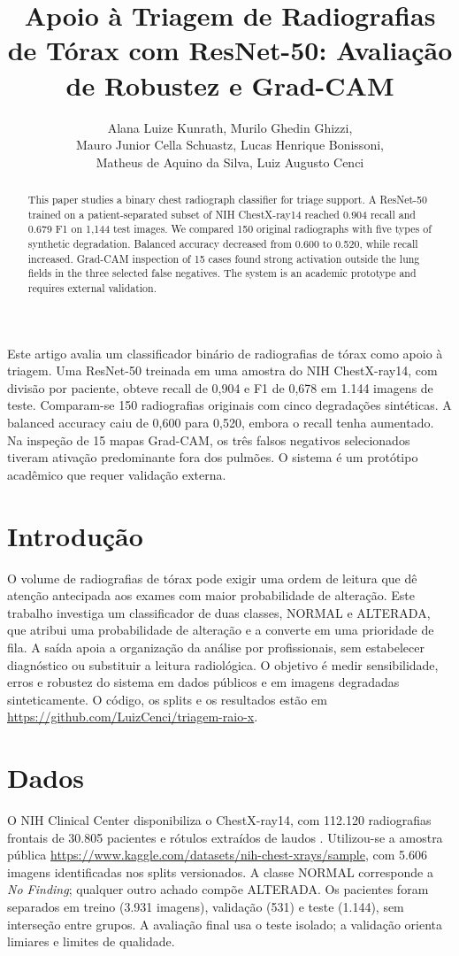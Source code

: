 \documentclass[12pt]{article}
\title{Apoio à Triagem de Radiografias de Tórax com ResNet-50: Avaliação de Robustez e Grad-CAM}
\author{Alana Luize Kunrath\inst{1}, Murilo Ghedin Ghizzi\inst{1},\\
Mauro Junior Cella Schuastz\inst{1}, Lucas Henrique Bonissoni\inst{1},\\
Matheus de Aquino da Silva\inst{1}, Luiz Augusto Cenci\inst{1}}
\begin{document}
\maketitle
\begin{abstract}
This paper studies a binary chest radiograph classifier for triage support. A ResNet-50 trained on a patient-separated subset of NIH ChestX-ray14 reached 0.904 recall and 0.679 F1 on 1,144 test images. We compared 150 original radiographs with five types of synthetic degradation. Balanced accuracy decreased from 0.600 to 0.520, while recall increased. Grad-CAM inspection of 15 cases found strong activation outside the lung fields in the three selected false negatives. The system is an academic prototype and requires external validation.
\end{abstract}
\begin{resumo}
Este artigo avalia um classificador binário de radiografias de tórax como apoio à triagem. Uma ResNet-50 treinada em uma amostra do NIH ChestX-ray14, com divisão por paciente, obteve recall de 0,904 e F1 de 0,678 em 1.144 imagens de teste. Comparam-se 150 radiografias originais com cinco degradações sintéticas. A balanced accuracy caiu de 0,600 para 0,520, embora o recall tenha aumentado. Na inspeção de 15 mapas Grad-CAM, os três falsos negativos selecionados tiveram ativação predominante fora dos pulmões. O sistema é um protótipo acadêmico que requer validação externa.
\end{resumo}

\section{Introdução}
O volume de radiografias de tórax pode exigir uma ordem de leitura que dê atenção antecipada aos exames com maior probabilidade de alteração. Este trabalho investiga um classificador de duas classes, NORMAL e ALTERADA, que atribui uma probabilidade de alteração e a converte em uma prioridade de fila. A saída apoia a organização da análise por profissionais, sem estabelecer diagnóstico ou substituir a leitura radiológica. O objetivo é medir sensibilidade, erros e robustez do sistema em dados públicos e em imagens degradadas sinteticamente. O código, os splits e os resultados estão em \url{https://github.com/LuizCenci/triagem-raio-x}.

\section{Dados}
O NIH Clinical Center disponibiliza o ChestX-ray14, com 112.120 radiografias frontais de 30.805 pacientes e rótulos extraídos de laudos \cite{wang2017chestxray}. Utilizou-se a amostra pública \url{https://www.kaggle.com/datasets/nih-chest-xrays/sample}, com 5.606 imagens identificadas nos splits versionados. A classe NORMAL corresponde a \textit{No Finding}; qualquer outro achado compõe ALTERADA. Os pacientes foram separados em treino (3.931 imagens), validação (531) e teste (1.144), sem interseção entre grupos. A avaliação final usa o teste isolado; a validação orienta limiares e limites de qualidade.
\end{document}
